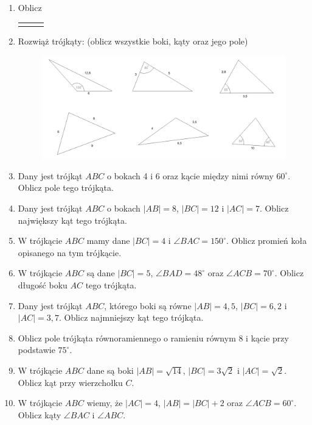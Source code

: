 \documentclass[12pt,a4paper]{article}
\begin{document}
\begin{enumerate}[1.]
		\item Oblicz 
		\begin{enumerate}[a)] \begin{tabular}{p{4cm} p{4cm} p{4cm}}
				\item $\sin 75^\circ=$& \vspace{0.25cm}\item$\cos 15^\circ=$& \vspace{0.25cm} \item$\text{tg } 105^\circ=$\\
		\end{tabular} \end{enumerate}
	
	\item Rozwiąż trójkąty: (oblicz wszystkie boki, kąty oraz jego pole)
	
	\begin{figure}[h]
		\includegraphics[scale=0.31]{t2_1}
	\end{figure}

	\newpage
	\item Dany jest trójkąt $ABC$ o bokach 4 i 6 oraz kącie między nimi równy $60^\circ$. Oblicz pole tego trójkąta.
	\item Dany jest trójkąt $ABC$ o bokach $|AB|=8$, $|BC|=12$ i $|AC|=7$. Oblicz największy kąt tego trójkąta.
	\item W trójkącie $ABC$ mamy dane $|BC|=4$ i $\angle BAC=150^\circ$. Oblicz promień koła opisanego na tym trójkącie.
	\item W trójkącie $ABC$ są dane $|BC|=5$, $\angle BAD=48^\circ$ oraz $\angle ACB=70^\circ$. Oblicz długość boku $AC$ tego trójkąta.
	\item Dany jest trójkąt $ABC$, którego boki są równe $|AB|=4,5$, $|BC|=6,2$ i $|AC|=3,7$. Oblicz najmniejszy kąt tego trójkąta.
	\item Oblicz pole trójkąta równoramiennego o ramieniu równym 8 i kącie przy podstawie $75^\circ$.
	\item W trójkącie $ABC$ dane są boki $|AB|=\sqrt{14}$, $|BC|=3\sqrt{2}$ i $|AC|=\sqrt{2}$. Oblicz kąt przy wierzchołku $C$.
	\item W trójkącie $ABC$ wiemy, że $|AC|=4$, $|AB|=|BC|+2$ oraz $\angle ACB = 60^\circ$. Oblicz kąty $\angle BAC$ i $\angle ABC$.

		
	\end{enumerate}
\end{document}
